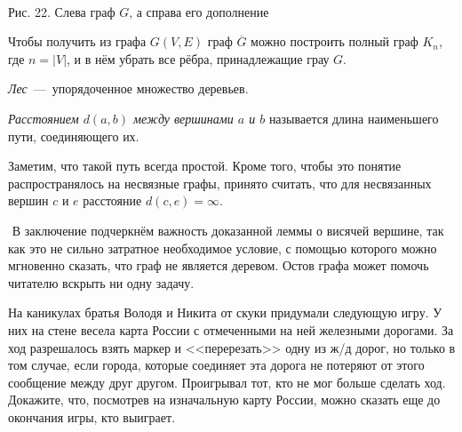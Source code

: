 \begin{center}
\;\ \;\ \;\ \;\ \;\ \;\ \;\ \;\ \;\ \;\ \;\ \;\ \;\
\newline
\newline
	\small Рис. 22. Слева граф $G$, а справа его дополнение
\end{center}

	Чтобы получить из графа $G(V, E)$ граф $\overline{G}$ можно построить полный граф $K_n$, где $n = |V|$, и в нём убрать все рёбра, принадлежащие грау $G$.

\begin{definition}
	\emph{Лес}~---~упорядоченное множество деревьев.
\end{definition}

\begin{definition}
	\emph{Расстоянием $d(a, b)$ между вершинами $a$ и $b$} называется длина наименьшего пути, соединяющего их.
\end{definition}
	
	Заметим, что такой путь всегда простой. Кроме того, чтобы это понятие распространялось на несвязные графы, принято считать, что для несвязанных вершин $c$ и $e$ расстояние $d(c, e) = \infty$.

$ $
\newline
	В заключение подчеркнём важность доказанной леммы о висячей вершине, так как это не сильно затратное необходимое условие, с помощью которого можно мгновенно сказать, что граф не является деревом. Остов графа может помочь читателю вскрыть ни одну задачу.


\begin{exersize}
	На каникулах братья Володя и Никита от скуки придумали следующую игру. У них на стене весела карта России с отмеченными на ней железными дорогами. За ход разрешалось взять маркер и <<перерезать>> одну из ж/д дорог, но только в том случае, если города, которые соединяет эта дорога не потеряют от этого сообщение между друг другом. Проигрывал тот, кто не мог больше сделать ход. Докажите, что, посмотрев на изначальную карту России, можно сказать еще до окончания игры, кто выиграет.
\end{exersize}

